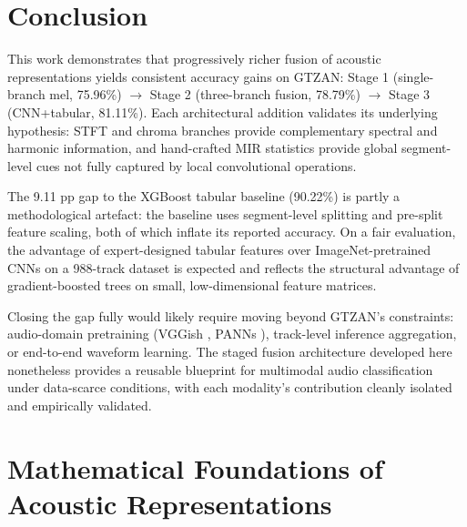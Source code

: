 \documentclass[10pt, twocolumn, a4paper]{article}
\begin{document}
\section{Conclusion}

This work demonstrates that progressively richer fusion of acoustic representations yields consistent accuracy gains on GTZAN: Stage 1 (single-branch mel, 75.96\%) $\to$ Stage 2 (three-branch fusion, 78.79\%) $\to$ Stage 3 (CNN+tabular, 81.11\%). Each architectural addition validates its underlying hypothesis: STFT and chroma branches provide complementary spectral and harmonic information, and hand-crafted MIR statistics provide global segment-level cues not fully captured by local convolutional operations.

The 9.11 pp gap to the XGBoost tabular baseline (90.22\%) is partly a methodological artefact: the baseline uses segment-level splitting and pre-split feature scaling, both of which inflate its reported accuracy. On a fair evaluation, the advantage of expert-designed tabular features over ImageNet-pretrained CNNs on a 988-track dataset is expected and reflects the structural advantage of gradient-boosted trees on small, low-dimensional feature matrices.

Closing the gap fully would likely require moving beyond GTZAN's constraints: audio-domain pretraining (VGGish \cite{hershey2017}, PANNs \cite{kong2020}), track-level inference aggregation, or end-to-end waveform learning. The staged fusion architecture developed here nonetheless provides a reusable blueprint for multimodal audio classification under data-scarce conditions, with each modality's contribution cleanly isolated and empirically validated.




\appendix

\section{Mathematical Foundations of Acoustic Representations}
\label{app:math}
\end{document}
